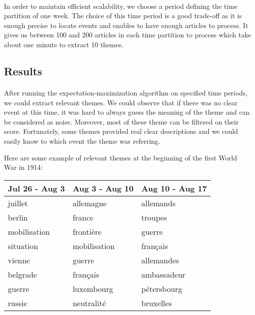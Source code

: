 \paragraph{}
In order to maintain efficient scalability, we choose a period defining the time partition of one week. The choice of this time period is a good trade-off as it is enough precise to locate events and enables to have enough articles to process. It gives us between 100 and 200 articles in each time partition to process which take about one minute to extract 10 themes.

\subsection{Results}

\paragraph{}
After running the expectation-maximization algorithm on specified time periods, we could extract relevant themes. We could observe that if there was no clear event at this time, it was hard to always guess the meaning of the theme and can be considered as noise. Moreover, most of these theme can be filtered on their score. Fortunately, some themes provided real clear descriptions and we could easily know to which event the theme was referring.

Here are some example of relevant themes at the beginning of the first World War in 1914:

\begin{center}
\begin{tabular}{|l|l|l|}
  \hline
  Jul 26 - Aug 3 & Aug 3 - Aug 10 & Aug 10 - Aug 17 \\
  \hline
  juillet & allemagne & allemands \\
  berlin & france & troupes \\
  mobilisation & frontière & guerre \\
  situation & mobilisation & français \\
  vienne & guerre & allemandes \\
  belgrade & français & ambassadeur \\
  guerre & luxembourg & pétersbourg \\
  russie & neutralité & bruxelles \\
  \hline
\end{tabular}
\end{center}

